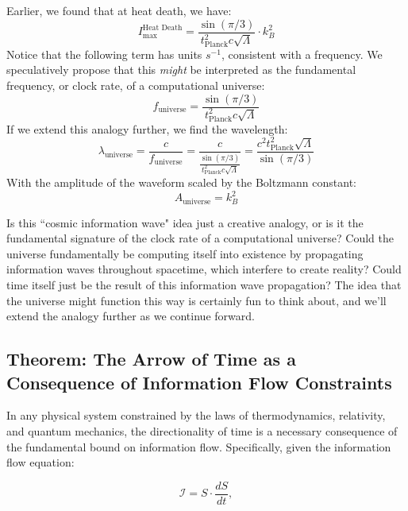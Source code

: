 \documentclass[12pt]{article}
\begin{document}
Earlier, we found that at heat death, we have:
\begin{equation}
    I_\text{max}^{\text{Heat Death}} = \frac{\sin(\pi / 3)}{t_\text{Planck}^2 c \sqrt{\Lambda}} \cdot k_B^2
\end{equation}
Notice that the following term has units $s^{-1}$, consistent with a frequency. We speculatively propose that this \textit{might} be interpreted as the fundamental frequency, or clock rate, of a computational universe:
\begin{equation}
    f_\text{universe} = \frac{\sin(\pi / 3)}{t_\text{Planck}^2 c \sqrt{\Lambda}} 
\end{equation}
If we extend this analogy further, we find the wavelength:
\begin{equation}
    \lambda_\text{universe} = \frac{c}{f_\text{universe}} = \frac{c}{\frac{\sin(\pi / 3)}{t_\text{Planck}^2 c \sqrt{\Lambda}}} = \frac{c^2 t_\text{Planck}^2 \sqrt{\Lambda}}{\sin(\pi / 3)}
\end{equation}
With the amplitude of the waveform scaled by the Boltzmann constant:
\begin{equation}
    A_\text{universe} = k_B^2
\end{equation}

Is this ``cosmic information wave" idea just a creative analogy, or is it the fundamental signature of the clock rate of a computational universe? Could the universe fundamentally be computing itself into existence by propagating information waves throughout spacetime, which interfere to create reality? Could time itself just be the result of this information wave propagation? The idea that the universe might function this way is certainly fun to think about, and we'll extend the analogy further as we continue forward.

\subsection{Theorem: The Arrow of Time as a Consequence of Information Flow Constraints}

In any physical system constrained by the laws of thermodynamics, relativity, and quantum mechanics, the directionality of time is a necessary consequence of the fundamental bound on information flow. Specifically, given the information flow equation:

\begin{equation}
    \mathcal{I} = S \cdot \frac{dS}{dt},
\end{equation}
\end{document}
